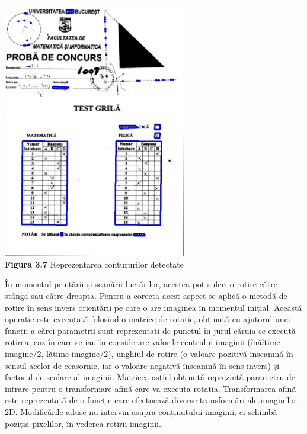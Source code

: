 \documentclass[a4paper,12pt]{report}
\newcommand\tab[1][1cm]{\hspace*{#1}}
\begin{document}
\begin {center} 
	\begin {footnotesize} 
		\includegraphics[width = 80mm]{fig3_7} \\
		\textbf  {Figura 3.7} Reprezentarea contururilor detectate
	\end {footnotesize} 
\end {center}
\tab În momentul printării și scanării lucrărilor, acestea pot suferi o rotire către stânga sau către dreapta. Pentru a corecta acest aspect se aplică o metodă de rotire în sens invers orientării pe care o are imaginea în momentul inițial. Această operație este executată folosind o matrice de rotație, obținută cu ajutorul unei funcții a cărei parametrii sunt reprezentați de punctul în jurul căruia se execută rotirea, caz în care se iau în considerare valorile centrului imaginii (înălțime imagine/2, lățime imagine/2), unghiul de rotire (o valoare pozitivă înseamnă în sensul acelor de ceasornic, iar o valoare negativă înseamnă în sens invers) și factorul de scalare al imaginii. Matricea astfel obținută reprezintă parametru de intrare pentru o transformare afină care va executa rotația. Transformarea afină\cite{opencv6} este reprezentată de o funcție care efectuează diverse transformări ale imaginilor 2D. Modificările aduse nu intervin asupra conținutului imaginii, ci schimbă poziția pixelilor, în vederea rotirii imaginii. 
\end{document}
